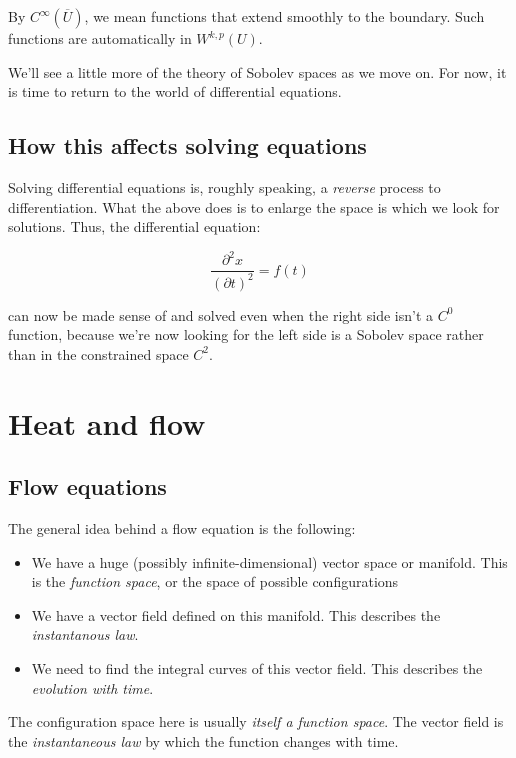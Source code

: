 \documentclass[a4paper]{amsart}
\begin{document}
By $C^\infty(\overline{U})$, we mean functions that extend smoothly to
the boundary. Such functions are automatically in $W^{k,p}(U)$.

We'll see a little more of the theory of Sobolev spaces as we move
on. For now, it is time to return to the world of differential
equations.

\subsection{How this affects solving equations}

Solving differential equations is, roughly speaking, a {\em reverse}
process to differentiation. What the above does is to enlarge the
space is which we look for solutions. Thus, the differential equation:

$$\frac{\partial^2x}{(\partial t)^2} = f(t)$$

can now be made sense of and solved even when the right side isn't a
$C^0$ function, because we're now looking for the left side is a
Sobolev space rather than in the constrained space $C^2$.

\section{Heat and flow}

\subsection{Flow equations}

The general idea behind a flow equation is the following:

\begin{itemize}

\item We have a huge (possibly infinite-dimensional) vector space or
  manifold. This is the {\em function space}, or the space of possible configurations

\item We have a vector field defined on this manifold. This describes the {\em instantanous law}.

\item We need to find the integral curves of this vector field. This describes the {\em evolution with time}.

\end{itemize}

The configuration space here is usually {\em itself a function
  space}. The vector field is the {\em instantaneous law} by which the
function changes with time.
\end{document}
